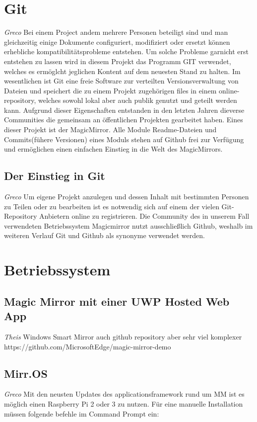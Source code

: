 \documentclass[12pt,a4paper]{report}
\begin{document}
\section{Git}
\textit{Greco}
Bei einem Project andem mehrere Personen beteiligt sind und man gleichzeitig einige Dokumente configuriert, modifiziert oder ersetzt können erhebliche kompatibilitätsprobleme entstehen. Um solche Probleme garnicht erst entstehen zu lassen wird in diesem Projekt das Programm GIT verwendet, welches es ermöglcht jeglichen Kontent auf dem neuesten Stand zu halten. Im wesentlichen ist Git eine freie Software zur verteilten Versionsverwaltung von Dateien und speichert die zu einem Projekt zugehörigen files in einem online-repository, welches sowohl lokal aber auch publik genutzt und geteilt werden kann. Aufgrund dieser Eigenschaften entstanden in den letzten Jahren dieverse Communities die gemeinsam an öffentlichen Projekten gearbeitet haben. Eines dieser Projekt ist der MagicMirror. Alle Module Readme-Dateien und Commits(fühere Versionen) eines Moduls stehen auf Github frei zur Verfügung und ermöglichen einen einfachen Einstieg in die Welt des MagicMirrors.

\subsection*{Der Einstieg in Git}
\textit{Greco}
Um eigene Projekt anzulegen und dessen Inhalt mit bestimmten Personen zu Teilen oder zu bearbeiten ist es notwendig sich auf einem der vielen Git-Repository Anbietern online zu registrieren. Die Community des in unserem Fall verwendeten Betriebssystem Magicmirror nutzt ausschließlich Github, weshalb im weiteren Verlauf Git und Github als synonyme verwendet werden. 

\section{Betriebssystem}
\subsection*{Magic Mirror mit einer UWP Hosted Web App}
\textit{Theis}
Windows Smart Mirror 
auch github repository aber sehr viel komplexer
https://github.com/MicrosoftEdge/magic-mirror-demo

\subsection*{Mirr.OS}
\textit{Greco}
Mit den neusten Updates des applicationsframework rund um MM ist es möglich einen Raspberry Pi 2 oder 3 zu nutzen. Für eine manuelle Installation müssen folgende befehle im Command Prompt ein:
\end{document}
